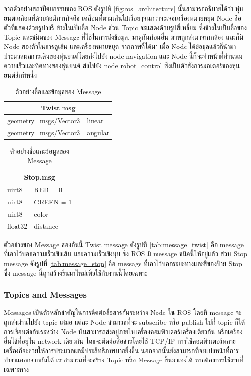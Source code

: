 จากตัวอย่างสถาปัตยกรรมของ ROS ดังรูปที่ \ref{fig:ros_architecture} นั้นสามารถอธิบายได้ว่า หุ่นยนต์เคลื่อนที่ด้วยล้อมีภารกิจคือ
เคลื่อนที่ตามเส้นไปเรื่อยๆจนกว่าจะเจอเครื่องหมายหยุด Node คือตัวที่แสดงด้วยรูปวงรี ข้างในเป็นชื่อ Node  ส่วน Topic จะแสดงด้วยรูปสี่เหลี่ยม
ซึ่งข้างในเป็นชื่อของ Topic และชนิดของ Message ที่ใช้ในการส่งข้อมูล, มาดูกันก่อนอื่น ภาพถูกส่งมาจากกล้อง และก็มี Node สองตัวในการดูเส้น และเครื่องหมายหยุด
จากภาพที่ได้มา เมื่อ Node ได้ข้อมูลแล้วก็นำมาประมวลผลการเดินของหุ่นยนต์โดยส่งไปยัง node navigation และ Node นี้ก็จะทำหน้าที่คำนวณความเร็วและทิศทางของหุ่นยนต์
ส่งไปยัง node robot\_control ซึ่งเป็นตัวสั่งการมอเตอร์ของหุ่นยนต์อีกทีหนึ่ง
\begin{table}[!ht]
	\begin{subtable}[h]{0.40\textwidth}
		\centering
		\begin{tabular}{| p{4cm}| p{1.5cm} |}
			\hline 
			\multicolumn{2}{|c|}{Twist.msg} \\
			\hline
			geometry\_msgs/Vector3 & linear  \\
			geometry\_msgs/Vector3 & angular \\
			\hline  
		\end{tabular}
		\caption{Message Twist}
		\label{tab:message_twist}
	\end{subtable}
	\hfill
	\begin{subtable}[h]{0.40\textwidth}
		\centering
		\begin{tabular}{| p{1.5cm}| p{2.5cm} |}
			\hline 
			\multicolumn{2}{|c|}{Stop.msg} \\
			\hline
			uint8   & RED = 0   \\
			uint8   & GREEN = 1 \\
			uint8   & color     \\
			float32 & distance  \\
			\hline  
		\end{tabular}
		\caption{Message Stop}
		\label{tab:message_stop}
	\end{subtable}
	\caption{ตัวอย่างชื่อและข้อมูลของ Message}
	\label{tab:message_example}
\end{table}

ตัวอย่างของ Message สองอันนี้ Twist message ดังรูปที่ \ref{tab:message_twist} คือ message ที่เอาไว้บอกความเร็วเชิงเส้น และความเร็วเชิงมุม
ซึ่ง ROS มี message ชนิดนี้ให้อยู่แล้ว ส่วน Stop message ดังรูปที่ \ref{tab:message_stop} คือ message ที่เอาไว้บอกระยะทางและสีของป้าย Stop
ซึ่ง message นี้ถูกสร้างขึ้นมาใหม่เพื่อใช้กับงานนี้โดยเฉพาะ

\subsubsection*{Topics and Messages}
Messages เป็นตัวหลักสำคัญในการติดต่อสื่อสารกันระหว่าง Node ใน ROS โดยที่ message จะถูกส่งผ่านไปยัง topic เสมอ
แต่ละ Node สามารถที่จะ subscribe หรือ publish ไปกี่ topic ก็ได้ การเชื่อมต่อกันระหว่าง Node นั้นสามารถส่งอยู่ภายในเครื่องคอมพิวเตอร์เครื่องเดียวกัน
หรือเครื่องอื่นได้ที่อยู่ใน network เดียวกัน โดยจะติดต่อสื่อสารโดยใช้ TCP/IP การใช้คอมพิวเตอร์หลายเครื่องก็จะช่วยให้การประมวลผลมีประสิทธิภาพมากยิ่งขึ้น
นอกจากนั้นยังสามารถที่จะแบ่งหน้าที่การทำงานออกจากกันได้ เราสามารถที่จะสร้าง Topic หรือ Message ขึ้นมาเองได้
หากต้องการใช้งานที่เฉพาะทาง

